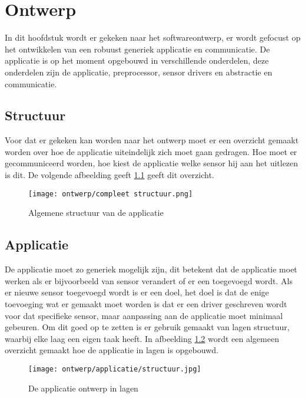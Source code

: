 \chapter{Ontwerp}
In dit hoofdstuk wordt er gekeken naar het softwareontwerp, er wordt gefocust op het ontwikkelen van een robuust generiek applicatie en communicatie. De applicatie is op het moment opgebouwd in verschillende onderdelen, deze onderdelen zijn de applicatie, preprocessor, sensor drivers en abstractie en communicatie.

\section{Structuur}
Voor dat er gekeken kan worden naar het ontwerp moet er een overzicht gemaakt worden over hoe de applicatie uiteindelijk zich moet gaan gedragen. Hoe moet er gecommuniceerd worden, hoe kiest de applicatie welke sensor hij aan het uitlezen is dit. De volgende afbeelding geeft \ref{fig:appstructuur} geeft dit overzicht. 
\begin{figure}[h!]
	\centering
	\label{fig:appstructuur}

	\texttt{[image: ontwerp/compleet structuur.png]}
	\caption{Algemene structuur van de applicatie}
\end{figure}

\newpage
\section{Applicatie}
De applicatie moet zo generiek mogelijk zijn, dit betekent dat de applicatie moet werken als er bijvoorbeeld van sensor verandert of er een toegevoegd wordt. Als er nieuwe sensor toegevoegd wordt is er een doel, het doel is dat de enige toevoeging wat er gemaakt moet worden is dat er een driver geschreven wordt voor dat specifieke sensor, maar aanpassing aan de applicatie moet minimaal gebeuren. Om dit goed op te zetten is er gebruik gemaakt van lagen structuur, waarbij elke laag een eigen taak heeft. In afbeelding \ref{fig:appontwerp} wordt een algemeen overzicht gemaakt hoe de applicatie in lagen is opgebouwd. 
\begin{figure}[h!]
	\centering
	\label{fig:appontwerp}

	\texttt{[image: ontwerp/applicatie/structuur.jpg]}
	\caption{De applicatie ontwerp in lagen}
\end{figure}




